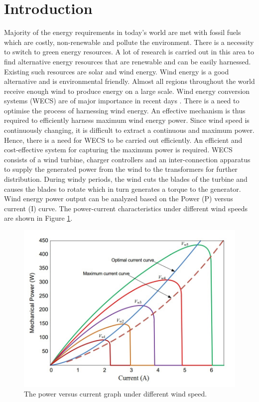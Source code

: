 \section{Introduction}
\label{intro}
Majority of the energy requirements in today’s world are met with fossil fuels which are costly, non-renewable and pollute the environment. There is a necessity to switch to green energy resources. A lot of research is carried out in this area to find alternative energy resources that are renewable and can be easily harnessed. Existing such resources are solar and wind energy. Wind energy is a good alternative and is environmental friendly. Almost all regions throughout the world receive enough wind to produce energy on a large scale. Wind energy conversion systems (WECS) are of major importance in recent days \cite{RefJ1}. There is a  need to optimise the process of harnessing wind energy. An effective mechanism is thus required to efficiently harness maximum wind energy power. Since wind speed is continuously changing, it is difficult to extract a continuous and maximum power. Hence, there is a need for WECS to be carried out efficiently. An efficient and cost-effective system for capturing the maximum power is required. WECS consists of a wind turbine, charger controllers and an inter-connection apparatus to supply the generated power from the wind to the transformers for further distribution. During windy periods, the wind cuts the blades of the turbine and causes the blades to rotate which in turn generates a torque to the generator. Wind energy power output can be analyzed based on the Power (P) versus current (I) curve. The power-current characteristics under different wind speeds are shown in Figure \ref{Figure:1}.
\begin{center}
\begin{figure}
\includegraphics[width=12cm,keepaspectratio]{1.png}
\caption{The power versus current graph under different wind speed.\cite{RefJ2}}
\label{Figure:1}    
\end{figure}
\end{center}
